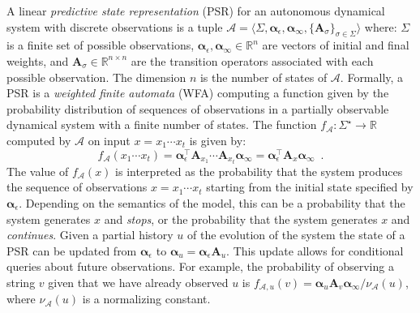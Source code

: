 \documentclass[letterpaper]{article}
\newcommand{\mat}[1]{\mathbf{#1}}
\newcommand{\A}{\mat{A}}
\newcommand{\Rset}{\mathbb{R}}
\newcommand{\alphavec}{\boldsymbol{\alpha}}
\newcommand{\aone}{\boldsymbol{\alpha}_\epsilon}
\newcommand{\ainf}{\boldsymbol{\alpha}_{\infty}}
\newcommand{\psrA}{\mathcal{A}}
\newcommand{\psrsigma}{\langle \Sigma, \aone, \ainf, \{\A_\sigma\}_{\sigma \in \Sigma} \rangle}
\begin{document}
A linear \emph{predictive state representation} (PSR) for an autonomous dynamical system with discrete observations is a tuple $\psrA = \psrsigma$ where: $\Sigma$ is a finite set of possible observations, $\aone, \ainf \in \Rset^n$ are vectors of initial and final weights, and $\A_\sigma \in \Rset^{n \times n}$ are the transition operators associated with each possible observation. The dimension $n$ is the number of states of $\psrA$. Formally, a PSR is a \emph{weighted finite automata} (WFA) \cite{wfahandbook} computing a function given by the probability distribution of sequences of observations in a partially observable dynamical system with a finite number of states. The function $f_{\psrA} : \Sigma^\star \to \Rset$ computed by $\psrA$ on input $x = x_1 \cdots x_t$ is given by:
\begin{equation*}
f_{\psrA}(x_1 \cdots x_t) = \aone^\top \A_{x_1} \cdots \A_{x_t} \ainf = \aone^\top \A_x \ainf \enspace.
\end{equation*}
The value of $f_{\psrA}(x)$ is interpreted as the probability that the system produces the sequence of observations $x = x_1 \cdots x_t$ starting from the initial state specified by $\aone$. Depending on the semantics of the model, this can be a probability that the system generates $x$ and \emph{stops}, or the probability that the system generates $x$ and \emph{continues}.
%
Given a partial history $u$ of the evolution of the system the state of a PSR can be updated from $\aone$ to $\alphavec_u = \aone \A_u$. This update allows for conditional queries about future observations. For example, the probability of observing a string $v$ given that we have already observed $u$ is
$f_{\psrA,u}(v) = \alphavec_u \A_v \ainf / \nu_{\psrA}(u)$,
where $\nu_{\psrA}(u)$ is a normalizing constant.
\end{document}
